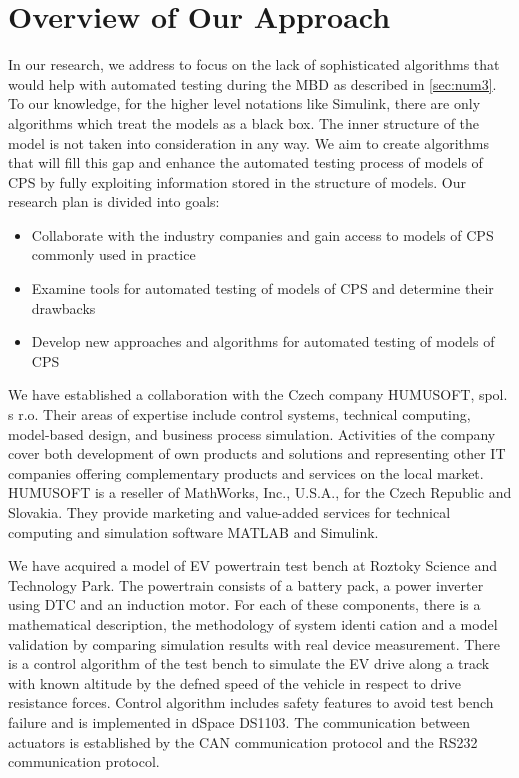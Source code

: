 \chapter{Overview of Our Approach}
\label{chap.ourapproach}

In our research, we address to focus on the lack of sophisticated algorithms that would help with automated testing during the MBD as described in \ref{sec:num3}. To our knowledge, for the higher level notations like Simulink, there are only algorithms which treat the models as a black box. The inner structure of the model is not taken into consideration in any way. We aim to create algorithms that will fill this gap and enhance the automated testing process of models of CPS by fully exploiting information stored in the structure of models. Our research plan is divided into goals:

\begin{itemize}
    \item Collaborate with the industry companies and gain access to models of CPS commonly used in practice
    \item Examine tools for automated testing of models of CPS and determine their drawbacks
    \item Develop new approaches and algorithms for automated testing of models of CPS
\end{itemize}

We have established a collaboration with the Czech company HUMUSOFT, spol. s r.o. Their areas of expertise include control systems, technical computing, model-based design, and business process simulation. Activities of the company cover both development of own products and solutions and representing other IT companies offering complementary products and services on the local market. HUMUSOFT is a reseller of MathWorks, Inc., U.S.A., for the Czech Republic and Slovakia. They provide marketing and value-added services for technical computing and simulation software MATLAB and Simulink.

We have acquired a model of EV powertrain test bench at Roztoky Science and Technology Park. The powertrain consists of a battery pack, a power inverter using DTC and an induction motor. For each of these components, there is a mathematical description, the methodology of system identication and a model validation by comparing simulation results with real device measurement. There is a control algorithm of the test bench to simulate the EV drive along a track with known altitude by the defned speed of the vehicle in respect to drive resistance forces. Control algorithm includes safety features to avoid test bench failure and is implemented in dSpace DS1103. The communication between actuators is established by the CAN communication protocol and the RS232 communication protocol.

